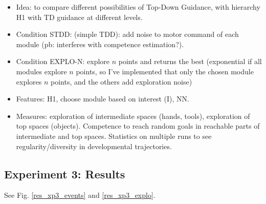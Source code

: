 \documentclass[conference]{include/IEEEtran}
\begin{document}
		\begin{itemize}
			\item Idea: to compare different possibilities of Top-Down Guidance, with hierarchy H1 with TD guidance at different levels.
			
			\item Condition STDD: (simple TDD): add noise to motor command of each module (pb: interferes with competence estimation?).
			
			\item Condition EXPLO-N: explore $n$ points and returns the best (exponential if all modules explore $n$ points, so I've implemented that only the chosen module explores $n$ points, and the others add exploration noise)
			
			\item Features: H1, choose module based on interest (I), NN.
			
			\item Measures: exploration of intermediate spaces (hands, tools), exploration of top spaces (objects). Competence to reach random goals in reachable parts of intermediate and top spaces. 
					Statistics on multiple runs to see regularity/diversity in developmental trajectories.
		\end{itemize}
		
		
	\subsection{Experiment 3: Results}
	
		See Fig. \ref{res_xp3_events} and \ref{res_xp3_explo}.
		
\end{document}
